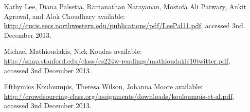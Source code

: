 \documentclass[a4paper]{article}
\begin{document}
\begin{thebibliography}{20}
	Kathy Lee, Diana Palsetia, Ramanathan Narayanan, Mostofa Ali Patwary, Ankit Agrawal, and Alok Choudhary
	\newblock available: \url{http://cucis.eecs.northwestern.edu/publications/pdf/LeePal11.pdf}, accessed 3nd December 2013.

	Michael Mathioudakis, Nick Koudas
	\newblock available: \url{http://snap.stanford.edu/class/cs224w-readings/mathioudakis10twitter.pdf}, accessed 3nd December 2013.
	
	Efthymios Kouloumpis, Theresa Wilson, Johanna Moore
	\newblock available: \url{http://crowdsourcing-class.org/assignments/downloads/kouloumpis-et-al.pdf}, accessed 3nd December 2013.

	\newblock{}
	\newblock{}
	
\end{thebibliography}
\end{document}
